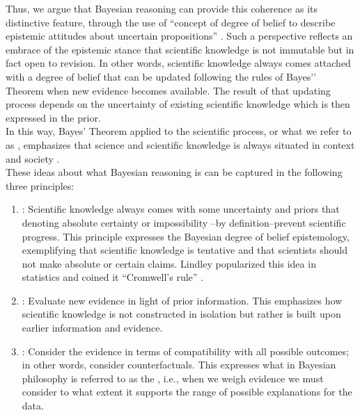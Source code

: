\documentclass[man, floatsintext]{apa7} %
\begin{document}
Thus, we argue that Bayesian reasoning can provide this coherence as its distinctive feature, through the use of ``concept of degree of belief to describe epistemic attitudes about uncertain propositions'' \parencite[, p. 2]{sprenger2019bayesian}. Such a perspective reflects an embrace of the epistemic stance that scientific knowledge is not immutable but in fact open to revision. In other words, scientific knowledge always comes attached with a degree of belief that can be updated following the rules of Bayes'’ Theorem when new evidence becomes available. The result of that updating process depends on the uncertainty of existing scientific knowledge which is then expressed in the prior. \\

In this way, Bayes' Theorem applied to the scientific process, or what we refer to as , emphasizes that science and scientific knowledge is always situated in context \parencite{so12} and society \parencite{driver1994constructing}. \\

These ideas about what Bayesian reasoning is can be captured in the following three principles:

\begin{enumerate}
    \item {}: Scientific knowledge always comes with some uncertainty and priors that denoting absolute certainty or impossibility --by definition--prevent scientific progress. This principle expresses the Bayesian degree of belief epistemology, exemplifying that scientific knowledge is tentative and that scientists should not make absolute or certain claims. Lindley popularized this idea in statistics and coined it ``Cromwell's rule'' \parencite[p. 104]{Lindley1985}.
    \item {}: Evaluate new evidence in light of prior information. This emphasizes how scientific knowledge is not constructed in isolation but rather is built upon earlier information and evidence.
    \item {}: Consider the evidence in terms of compatibility with all possible outcomes; in other words, consider counterfactuals. This expresses what in Bayesian philosophy is referred to as the  \parencite{adams1965logic}, i.e., when we weigh evidence we must consider to what extent it supports the range of possible explanations for the data. 
\end{enumerate}
\end{document}
